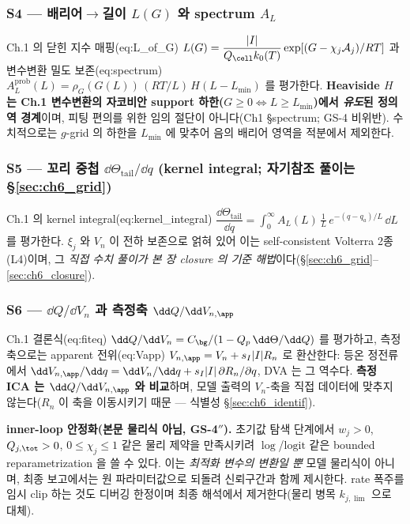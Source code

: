 \subsubsection{S4 — 배리어$\to$길이 $L(G)$ 와 spectrum $A_L$}\label{sec:ch6_S4}
Ch.1 의 닫힌 지수 매핑(eq:L\_of\_G) $L(G)=\dfrac{|I|}{Q_\cell k_0(T)}\exp[(G-\chi_j\mathcal A_j)/RT]$ 과 변수변환
밀도 보존(eq:spectrum) $A_L^{\mathrm{prob}}(L)=\rho_G(G(L))\,(RT/L)\,H(L-L_{\min})$ 를 평가한다. \textbf{Heaviside
$H$ 는 Ch.1 변수변환의 자코비안 support 하한($G\ge0\Leftrightarrow L\ge L_{\min}$)에서 \emph{유도}된 정의역
경계}이며, 피팅 편의를 위한 임의 절단이 아니다(Ch1 \S spectrum; GS-4 비위반). 수치적으로는 $g$-grid 의 하한을
$L_{\min}$ 에 맞추어 음의 배리어 영역을 적분에서 제외한다.

\subsubsection{S5 — 꼬리 중첩 $\dd\Theta_\mathrm{tail}/\dd q$ (kernel integral; 자기참조 풀이는 \S\ref{sec:ch6_grid})}\label{sec:ch6_S5}
Ch.1 의 kernel integral(eq:kernel\_integral) $\dfrac{\dd\Theta_\mathrm{tail}}{\dd q}=\int_0^\infty A_L(L)\,\tfrac1L\,
e^{-(q-q_a)/L}\,\dd L$ 를 평가한다. $\xi_j$ 와 $V_n$ 이 전하 보존으로 얽혀 있어 이는 self-consistent Volterra
2종(L4)이며, 그 \emph{직접 수치 풀이가 본 장 closure 의 기준 해법}이다(\S\ref{sec:ch6_grid}--\ref{sec:ch6_closure}).

\subsubsection{S6 — $\dd Q/\dd V_n$ 과 측정축 $\dd Q/\dd V_{n,\app}$}\label{sec:ch6_S6}
Ch.1 결론식(eq:fiteq) $\dd Q/\dd V_n=C_\bg/(1-Q_p\,\dd\Theta/\dd Q)$ 를 평가하고, 측정축으로는 apparent
전위(eq:Vapp) $V_{n,\app}=V_n+s_I|I|R_n$ 로 환산한다: 등온 정전류에서 $\dd V_{n,\app}/\dd q=\dd V_n/\dd q+
s_I|I|\,\partial R_n/\partial q$, DVA 는 그 역수다. \textbf{측정 ICA 는 $\dd Q/\dd V_{n,\app}$ 와 비교}하며, 모델
출력의 $V_n$-축을 직접 데이터에 맞추지 않는다($R_n$ 이 축을 이동시키기 때문 — 식별성 \S\ref{sec:ch6_identif}).

\begin{practicebox}
\textbf{inner-loop 안정화(본문 물리식 아님, GS-4$''$).} 초기값 탐색 단계에서 $w_j>0$, $Q_{j,\tot}>0$,
$0\le\chi_j\le1$ 같은 물리 제약을 만족시키려 $\log$/$\mathrm{logit}$ 같은 bounded reparametrization 을 쓸 수
있다. 이는 \emph{최적화 변수의 변환일 뿐} 모델 물리식이 아니며, 최종 보고에서는 원 파라미터값으로 되돌려
신뢰구간과 함께 제시한다. rate 폭주를 임시 clip 하는 것도 디버깅 한정이며 최종 해석에서 제거한다(물리 병목
$k_{j,\lim}$ 으로 대체).
\end{practicebox}

